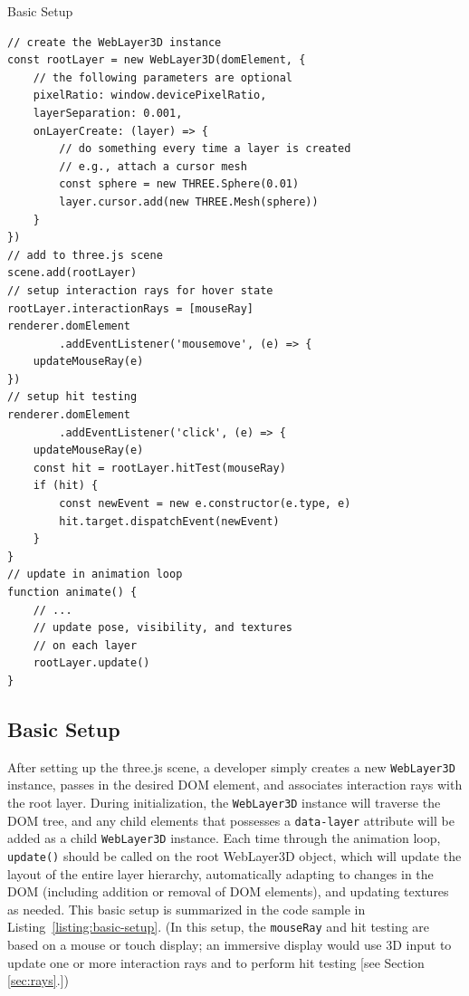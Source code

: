 \documentclass[sigconf]{acmart}
\begin{document}
\begin{listing}[H]
\caption{Basic Setup}
\label{listing:basic-setup}
\begin{verbatim}
// create the WebLayer3D instance
const rootLayer = new WebLayer3D(domElement, {
    // the following parameters are optional
    pixelRatio: window.devicePixelRatio,
    layerSeparation: 0.001,
    onLayerCreate: (layer) => {
        // do something every time a layer is created
        // e.g., attach a cursor mesh
        const sphere = new THREE.Sphere(0.01)
        layer.cursor.add(new THREE.Mesh(sphere))
    }
}) 
// add to three.js scene
scene.add(rootLayer)
// setup interaction rays for hover state 
rootLayer.interactionRays = [mouseRay]
renderer.domElement
        .addEventListener('mousemove', (e) => {
    updateMouseRay(e)
})
// setup hit testing
renderer.domElement
        .addEventListener('click', (e) => {
    updateMouseRay(e)
    const hit = rootLayer.hitTest(mouseRay)
    if (hit) {
        const newEvent = new e.constructor(e.type, e)
        hit.target.dispatchEvent(newEvent)
    }
}
// update in animation loop
function animate() {
    // ...
    // update pose, visibility, and textures 
    // on each layer
    rootLayer.update()
}
\end{verbatim}
\end{listing}

\subsection{Basic Setup}

After setting up the three.js scene, a developer simply creates a new \verb|WebLayer3D| instance, passes in the desired DOM element, and associates interaction rays with the root layer. During initialization, the \verb|WebLayer3D| instance will traverse the DOM tree, and any child elements that possesses a \verb|data-layer| attribute will be added as a child \verb|WebLayer3D| instance. Each time through the animation loop, \verb|update()| should be called on the root WebLayer3D object, which will update the layout of the entire layer hierarchy, automatically adapting to changes in the DOM (including addition or removal of DOM elements), and updating textures as needed. This basic setup is summarized in the code sample in Listing~\ref{listing:basic-setup}. (In this setup, the \verb|mouseRay| and hit testing are based on a mouse or touch display; an immersive display would use 3D input to update one or more interaction rays and to perform hit testing [see Section \ref{sec:rays}.]) 
\end{document}
